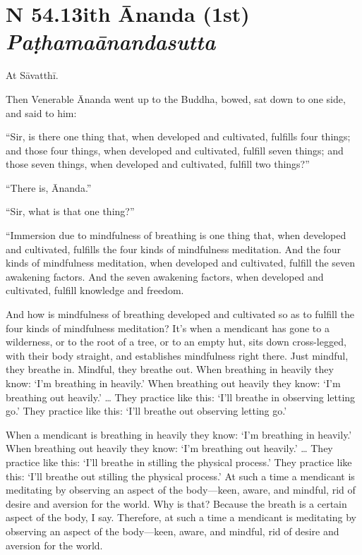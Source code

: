 \documentclass[12pt,openany]{book}%
\newcommand*{\suttatitleacronym}[1]{\smaller[2]{#1}\vspace*{.3em}}
\newcommand*{\suttatitletranslation}[1]{\linebreak{#1}}
\newcommand*{\suttatitleroot}[1]{\linebreak\smaller[2]\itshape{#1}}
\newcommand*{\tocacronym}[1]{\hspace*{-3.3em}{#1}\quad}
\newcommand*{\toctranslation}[1]{#1}
\newcommand*{\tocroot}[1]{(\textit{#1})}
\begin{document}
%
\section*{{\suttatitleacronym SN 54.13}{\suttatitletranslation With Ānanda (1st) }{\suttatitleroot Paṭhamaānandasutta}}
\addcontentsline{toc}{section}{\tocacronym{SN 54.13} \toctranslation{With Ānanda (1st) } \tocroot{Paṭhamaānandasutta}}

At \textsanskrit{Sāvatthī}. 

Then Venerable Ānanda went up to the Buddha, bowed, sat down to one side, and said to him: 

“Sir, is there one thing that, when developed and cultivated, fulfills four things; and those four things, when developed and cultivated, fulfill seven things; and those seven things, when developed and cultivated, fulfill two things?” 

“There is, Ānanda.” 

“Sir, what is that one thing?” 

“Immersion due to mindfulness of breathing is one thing that, when developed and cultivated, fulfills the four kinds of mindfulness meditation. And the four kinds of mindfulness meditation, when developed and cultivated, fulfill the seven awakening factors. And the seven awakening factors, when developed and cultivated, fulfill knowledge and freedom. 

And how is mindfulness of breathing developed and cultivated so as to fulfill the four kinds of mindfulness meditation? It’s when a mendicant has gone to a wilderness, or to the root of a tree, or to an empty hut, sits down cross-legged, with their body straight, and establishes mindfulness right there. Just mindful, they breathe in. Mindful, they breathe out. When breathing in heavily they know: ‘I’m breathing in heavily.’ When breathing out heavily they know: ‘I’m breathing out heavily.’ … They practice like this: ‘I’ll breathe in observing letting go.’ They practice like this: ‘I’ll breathe out observing letting go.’ 

When a mendicant is breathing in heavily they know: ‘I’m breathing in heavily.’ When breathing out heavily they know: ‘I’m breathing out heavily.’ … They practice like this: ‘I’ll breathe in stilling the physical process.’ They practice like this: ‘I’ll breathe out stilling the physical process.’ At such a time a mendicant is meditating by observing an aspect of the body—keen, aware, and mindful, rid of desire and aversion for the world. Why is that? Because the breath is a certain aspect of the body, I say. Therefore, at such a time a mendicant is meditating by observing an aspect of the body—keen, aware, and mindful, rid of desire and aversion for the world. 
\end{document}

